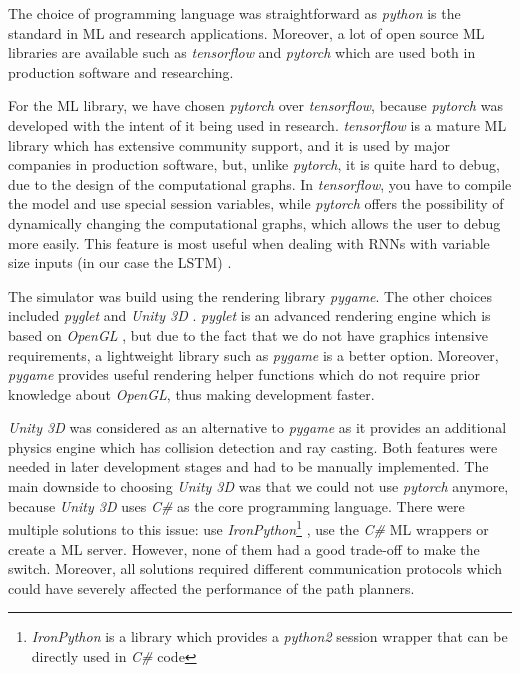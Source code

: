 The choice of programming language was straightforward as \textit{python} is the standard in ML and research applications. Moreover, a lot of open source ML libraries are available such as \textit{tensorflow} \cite{tensorflow2015_whitepaper} and \textit{pytorch} which are used both in production software and researching.

For the ML library, we have chosen \textit{pytorch} over \textit{tensorflow}, because \textit{pytorch} was developed with the intent of it being used in research. \textit{tensorflow} is a mature ML library which has extensive community support, and it is used by major companies in production software, but, unlike \textit{pytorch}, it is quite hard to debug, due to the design of the computational graphs. In \textit{tensorflow}, you have to compile the model and use special session variables, while \textit{pytorch} offers the possibility of dynamically changing the computational graphs, which allows the user to debug more easily. This feature is most useful when dealing with RNNs with variable size inputs (in our case the LSTM) \cite{tensorflow_vs_pytorch}.

The simulator was build using the rendering library \textit{pygame}. The other choices included \textit{pyglet} \cite{pyglet} and \textit{Unity 3D} \cite{bartneck2015robot}. \textit{pyglet} is an advanced rendering engine which is based on \textit{OpenGL} \cite{opengl}, but due to the fact that we do not have graphics intensive requirements, a lightweight library such as \textit{pygame} is a better option. Moreover, \textit{pygame} provides useful rendering helper functions which do not require prior knowledge about \textit{OpenGL}, thus making development faster.

\textit{Unity 3D} was considered as an alternative to \textit{pygame} as it provides an additional physics engine which has collision detection and ray casting. Both features were needed in later development stages and had to be manually implemented. The main downside to choosing \textit{Unity 3D} was that we could not use \textit{pytorch} anymore, because \textit{Unity 3D} uses \textit{C\#} as the core programming language. There were multiple solutions to this issue: use \textit{IronPython}\footnote{\textit{IronPython} is a library which provides a \textit{python2} session wrapper that can be directly used in \textit{C\#} code} \cite{foord2009ironpython}, use the \textit{C\#} ML wrappers or create a ML server. However, none of them had a good trade-off to make the switch. Moreover, all solutions required different communication protocols which could have severely affected the performance of the path planners.

